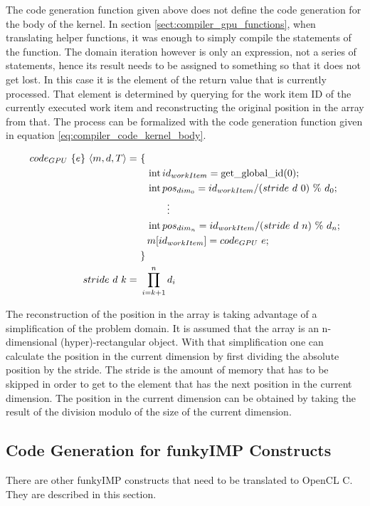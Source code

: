 The code generation function given above does not define the code generation for the body of the kernel. In section \ref{sect:compiler_gpu_functions}, when translating helper functions, it was enough to simply compile the statements of the function. The domain iteration however is only an expression, not a series of statements, hence its result needs to be assigned to something so that it does not get lost. In this case it is the element of the return value that is currently processed. That element is determined by querying for the work item ID of the currently executed work item and reconstructing the original position in the array from that. The process can be formalized with the code generation function given in equation \ref{eq:compiler_code_kernel_body}.

\begin{align}
	\label{eq:compiler_code_kernel_body}
	code_{GPU}\ \{e\}\ \langle m,d,T\rangle =	&\ \{\\
						&\quad \operatorname{int} id_{workItem} = \operatorname{get\_global\_id}(0);\notag\\
						&\quad \operatorname{int} pos_{dim_0} = id_{workItem} / (stride\ d\ 0)\ \%\ d_0;\notag\\
						&\quad\qquad\vdots\notag\\
						&\quad \operatorname{int} pos_{dim_n} = id_{workItem} / (stride\ d\ n)\ \%\ d_n;\notag\\
						&\quad m[id_{workItem}] = code_{GPU}\ e;\notag\\
						&\ \notag\}\\
	stride\ d\ k = 		&\ \prod_{i=k+1}^{n} d_i \notag
\end{align}

The reconstruction of the position in the array is taking advantage of a simplification of the problem domain. It is assumed that the array is an n-dimensional (hyper)-rectangular object. With that simplification one can calculate the position in the current dimension by first dividing the absolute position by the stride. The stride is the amount of memory that has to be skipped in order to get to the element that has the next position in the current dimension. The position in the current dimension can be obtained by taking the result of the division modulo of the size of the current dimension.

\subsection{Code Generation for funkyIMP Constructs}
\label{sect:compiler_gpu_code_generic}
There are other funkyIMP constructs that need to be translated to OpenCL C. They are described in this section.


